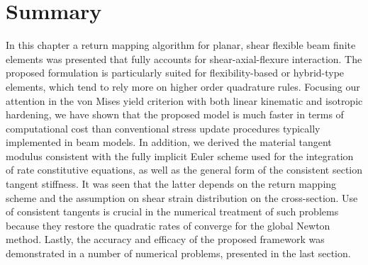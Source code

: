 

\section{Summary}

In this chapter a return mapping algorithm for planar, shear 
flexible beam finite elements was presented that fully accounts for 
shear-axial-flexure 
interaction. The proposed formulation is particularly suited for 
flexibility-based or 
hybrid-type elements, which tend to rely more on higher order quadrature rules. 
Focusing our attention in the von Mises yield criterion with both linear 
kinematic and 
isotropic hardening, we have shown that the proposed model is much faster in 
terms of computational cost than 
conventional stress update procedures typically implemented in beam models. In 
addition, we derived the material tangent modulus consistent with the fully 
implicit Euler scheme used for the integration of rate constitutive equations, 
as well as the general form of the consistent section tangent stiffness. It was 
seen that 
the latter depends on the return mapping scheme and the assumption on shear 
strain 
distribution on the cross-section. Use of consistent tangents is crucial in the 
numerical treatment of such problems because they restore the quadratic rates 
of 
converge for the global Newton method. Lastly, the accuracy and efficacy of the 
proposed 
framework was demonstrated in a number of numerical problems, presented in the 
last section. 